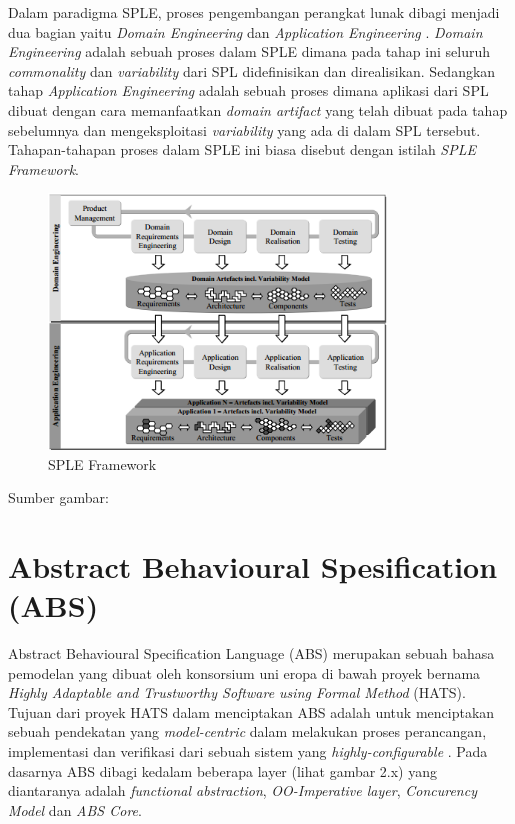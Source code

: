 \noindent
Dalam paradigma SPLE, proses pengembangan perangkat lunak dibagi menjadi dua bagian yaitu \textit{Domain Engineering} dan \textit{Application Engineering} \citep[p.~21]{pohl2005software}. \textit{Domain Engineering} adalah sebuah proses dalam SPLE dimana pada tahap ini seluruh \textit{commonality} dan \textit{variability} dari SPL didefinisikan dan direalisikan. Sedangkan tahap \textit{Application Engineering} adalah sebuah proses dimana aplikasi dari SPL dibuat dengan cara memanfaatkan \textit{domain artifact} yang telah dibuat pada tahap sebelumnya dan mengeksploitasi \textit{variability} yang ada di dalam SPL tersebut. Tahapan-tahapan proses dalam SPLE ini biasa disebut dengan istilah \textit{SPLE Framework}. \\

\begin{figure}
    \centering
    \includegraphics[width=0.8\textwidth]
        {img/sple-process.png}
    \caption{SPLE Framework}
\end{figure}
\vspace{-0.8cm}
\begin{center}
{\small Sumber gambar: \citep{pohl2005software}}
\end{center}

\section{Abstract Behavioural Spesification (ABS)}
\noindent
Abstract Behavioural Specification Language (ABS) merupakan sebuah bahasa pemodelan yang dibuat oleh konsorsium uni eropa di bawah proyek bernama \textit{Highly Adaptable and Trustworthy Software using Formal Method} (HATS). Tujuan dari proyek HATS dalam menciptakan ABS adalah untuk menciptakan sebuah pendekatan yang \textit{model-centric} dalam melakukan proses perancangan, implementasi dan verifikasi dari sebuah sistem yang \textit{highly-configurable} \citep{clarke2012variability}. Pada dasarnya ABS dibagi kedalam beberapa layer (lihat gambar 2.x) yang diantaranya adalah \textit{functional abstraction}, \textit{OO-Imperative layer}, \textit{Concurency Model} dan \textit{ABS Core}. \\

